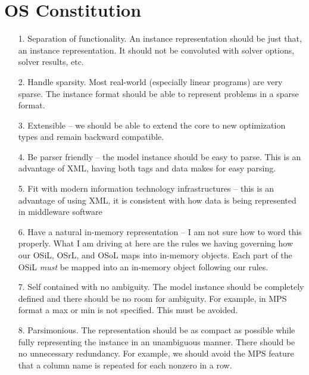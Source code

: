 
\section{OS Constitution}\label{section:constitution}

\begin{itemize}


\item[1.]  Separation of functionality. An instance representation should be just that, an instance representation. It should not be convoluted with solver options, solver results, etc.

\item[2.]  Handle sparsity.  Most real-world (especially linear programs) are very sparse.  The instance format should be able to represent problems in a sparse format. 

\item[3.]  Extensible  -- we should be able to extend the core to new optimization types and remain backward compatible. 

\item[4.] Be parser friendly -- the model instance should be easy to parse. This is an advantage of XML, having both tags and data makes for easy parsing. 

\item[5.]   Fit with modern information technology infrastructures -- this is an advantage of using XML, it is consistent with how data is being represented  in middleware software

\item[6.] Have a natural in-memory representation  -- I am not sure how to word this properly. What I am driving at here  are the rules we  having governing how our OSiL, OSrL, and OSoL maps into in-memory objects. Each part of the OSiL  {\it must} be mapped into an in-memory object following our rules. 


\item[7.]  Self contained with no ambiguity.  The model instance should be completely defined and there should  be no room for ambiguity. For example, in MPS format a max or min is not specified. This must be  avoided. 

\item[8.]  Parsimonious. The representation should be as compact as possible while fully representing the instance in an unambiguous manner.  There should be no unnecessary redundancy. For example, we should avoid the MPS feature that a column name is repeated for each nonzero in a row.


\end{itemize}
